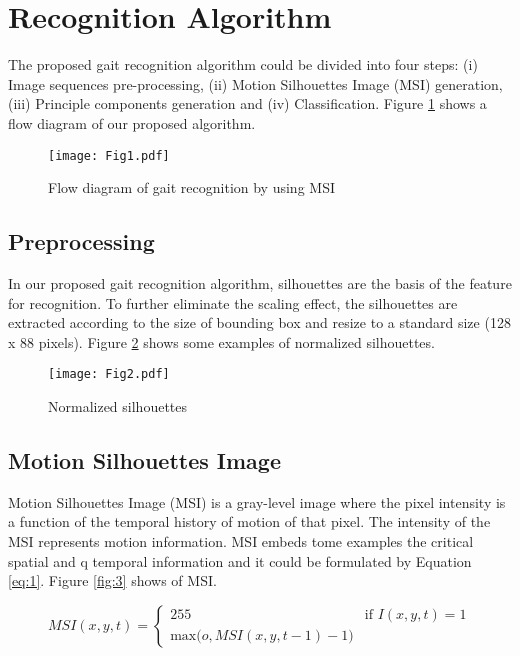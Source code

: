 \documentclass{style1}
\date{ }
\begin{document}
\tableofcontents
\newpage
\section{Recognition Algorithm}
The proposed gait recognition algorithm could be divided into four steps: (i) Image sequences pre-processing, (ii) Motion Silhouettes Image (MSI) generation, (iii) Principle components generation and (iv) Classification. Figure \ref{fig:1} shows a flow diagram of our proposed algorithm.

\begin{figure}[ht!]
\centering\texttt{[image: Fig1.pdf]}
\caption{Flow diagram of gait recognition by using MSI}
\label{fig:1}
\end{figure}
\subsection{Preprocessing}
In our proposed gait recognition algorithm, silhouettes are the basis of the feature for recognition. To further eliminate the scaling effect, the silhouettes are extracted according to the size of bounding box and resize to a standard size (128 x 88 pixels). Figure \ref{fig:2} shows some examples of normalized silhouettes. 

\begin{figure}[ht!]
\centering\texttt{[image: Fig2.pdf]}
\caption{Normalized silhouettes}
\label{fig:2}
\end{figure}
\subsection{Motion Silhouettes Image}
Motion Silhouettes Image (MSI) is a gray-level image where the pixel intensity is a function of the temporal history of motion of that pixel. The intensity of the MSI represents motion information. MSI embeds tome examples the critical spatial and q temporal information and it could be formulated by Equation \ref{eq:1}. Figure \ref{fig:3} shows of MSI.

\begin{equation}
MSI(x,y,t) = 
\begin{cases}
255 & \text{if } I(x,y,t) = 1\\
\text{max($o, MSI(x,y,t-1)-1)$}
\end{cases}
\label{eq:1}
\end{equation}
\end{document}

